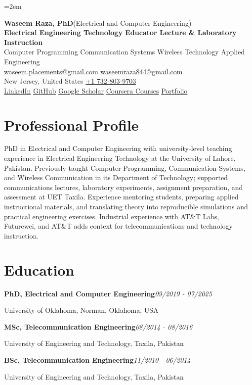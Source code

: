 \documentclass[9pt,letterpaper]{extarticle}
\newcommand{\entry}[2]{\Needspace{4\baselineskip}\textbf{#1}\hfill\textit{#2}\par}
\begin{document}
\emergencystretch=2em
\begin{center}
{\LARGE\bfseries Waseem Raza, PhD}{\normalsize\mdseries \enspace (Electrical and Computer Engineering)}\\[2pt]
{\large\bfseries Electrical Engineering Technology Educator \textbar{} Lecture \& Laboratory Instruction}\\[1pt]
{\small Computer Programming \textbar{} Communication Systems \textbar{} Wireless Technology \textbar{} Applied Engineering}\\[3pt]
{\footnotesize {}\enspace \href{mailto:waseem.placements@gmail.com}{waseem.placements@gmail.com} \textbar{} \href{mailto:waseemraza844@gmail.com}{waseemraza844@gmail.com}\\[1pt]New Jersey, United States \quad {}\enspace \href{tel:+17328039703}{+1 732-803-9703}\\[1pt]\href{https://www.linkedin.com/in/waseem-raza-phd-9a737858/}{LinkedIn} \textbar{} \href{https://github.com/WaseemRaza844}{GitHub} \textbar{} \href{https://scholar.google.com/citations?user=d58Drr0AAAAJ\&hl=en}{Google Scholar} \textbar{} \href{https://waseemraza844.github.io/portfolio/learning.html}{Coursera Courses} \textbar{} \href{https://waseemraza844.github.io/portfolio/}{Portfolio}}
\end{center}
\vspace{-5pt}
\section{Professional Profile}
PhD in Electrical and Computer Engineering with university-level teaching experience in Electrical Engineering Technology at the University of Lahore, Pakistan. Previously taught Computer Programming, Communication Systems, and Wireless Communication in its Department of Technology; supported communications lectures, laboratory experiments, assignment preparation, and assessment at UET Taxila. Experience mentoring students, preparing applied instructional materials, and translating theory into reproducible simulations and practical engineering exercises. Industrial experience with AT\&T Labs, Futurewei, and AT\&T adds context for telecommunications and technology instruction.
\section{Education}
\entry{PhD, Electrical and Computer Engineering}{09/2019 - 07/2025}
University of Oklahoma, Norman, Oklahoma, USA\par
\entry{MSc, Telecommunication Engineering}{08/2014 - 08/2016}
University of Engineering and Technology, Taxila, Pakistan\par
\entry{BSc, Telecommunication Engineering}{11/2010 - 06/2014}
University of Engineering and Technology, Taxila, Pakistan\par
{}
\end{document}
